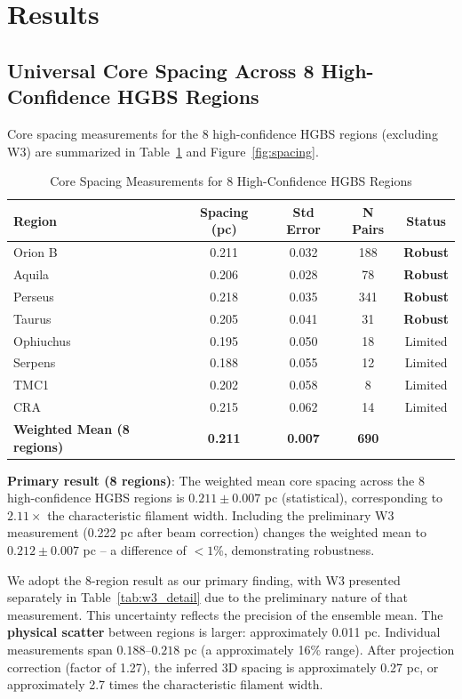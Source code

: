 \documentclass[11pt,a4paper]{article}
\begin{document}
\section{Results}
\label{sec:results}

\subsection{Universal Core Spacing Across 8 High-Confidence HGBS Regions}

Core spacing measurements for the 8 high-confidence HGBS regions (excluding W3) are summarized in Table~\ref{tab:all_regions} and Figure~\ref{fig:spacing}.

\begin{table}[H]
\centering
\caption{Core Spacing Measurements for 8 High-Confidence HGBS Regions}
\label{tab:all_regions}
\begin{tabular}{lcccc}
\toprule
Region & Spacing (pc) & Std Error & N Pairs & Status \\
\midrule
Orion B  & 0.211 & 0.032 & 188 & \textbf{Robust} \\
Aquila   & 0.206 & 0.028 & 78  & \textbf{Robust} \\
Perseus  & 0.218 & 0.035 & 341 & \textbf{Robust} \\
Taurus   & 0.205 & 0.041 & 31  & \textbf{Robust} \\
\midrule
Ophiuchus& 0.195 & 0.050 & 18  & Limited \\
Serpens  & 0.188 & 0.055 & 12  & Limited \\
TMC1     & 0.202 & 0.058 & 8   & Limited \\
CRA      & 0.215 & 0.062 & 14  & Limited \\
\midrule
\textbf{Weighted Mean (8 regions)} & \textbf{0.211} & \textbf{0.007} & \textbf{690} & \\
\bottomrule
\end{tabular}
\end{table}

\noindent\textbf{Primary result (8 regions)}: The weighted mean core spacing across the 8 high-confidence HGBS regions is $0.211 \pm 0.007$ pc (statistical), corresponding to $2.11\times$ the characteristic filament width. Including the preliminary W3 measurement (0.222 pc after beam correction) changes the weighted mean to $0.212 \pm 0.007$ pc -- a difference of $<1$\%, demonstrating robustness.

We adopt the 8-region result as our primary finding, with W3 presented separately in Table~\ref{tab:w3_detail} due to the preliminary nature of that measurement. This uncertainty reflects the precision of the ensemble mean. The \textbf{physical scatter} between regions is larger: approximately 0.011 pc. Individual measurements span $0.188$--$0.218$ pc (a approximately 16\% range). After projection correction (factor of 1.27), the inferred 3D spacing is approximately 0.27 pc, or approximately 2.7 times the characteristic filament width.
\end{document}
